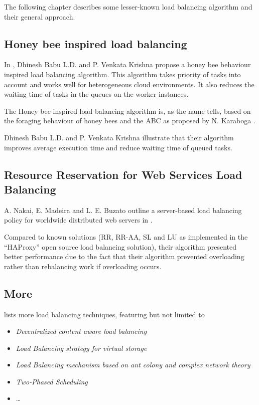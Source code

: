 The following chapter describes some lesser-known load balancing algorithm and
their general approach.

\subsection{Honey bee inspired load balancing}

In \cite{honeybee}, Dhinesh Babu L.D. and P. Venkata Krishna propose a honey bee
behaviour inspired load balancing algorithm.
This algorithm takes priority of tasks into account and works well for
heterogeneous cloud environments.
It also reduces the waiting time of tasks in the queues on the worker instances.

The Honey bee inspired load balancing algorithm is, as the name tells, based on
the foraging behaviour of honey bees and the \ac{ABC} as proposed by
N. Karaboga \cite{honeybee}.

Dhinesh Babu L.D. and P. Venkata Krishna illustrate that their algorithm
improves average execution time and reduce waiting time of queued tasks.

\subsection{Resource Reservation for Web Services Load Balancing}

A. Nakai, E. Madeira and L. E. Buzato outline a server-based load balancing
policy for worldwide distributed web servers in \cite{nakai}.

Compared to known solutions (\ac{RR}, \ac{RR-AA}, \ac{SL} and \ac{LU} as
implemented in the ``HAProxy'' open source load balancing solution), their
algorithm presented better performance due to the fact that their algorithm
prevented overloading rather than rebalancing work if overloading occurs.

\subsection{More}

\cite{cloudLBTech} lists more load balancing techniques, featuring but not
limited to
\begin{itemize}
    \item \emph{Decentralized content aware load balancing}
    \item \emph{Load Balancing strategy for virtual storage}
    \item \emph{Load Balancing mechanism based on ant colony and complex network
        theory}
    \item \emph{Two-Phased Scheduling}
    \item \dots
\end{itemize}

